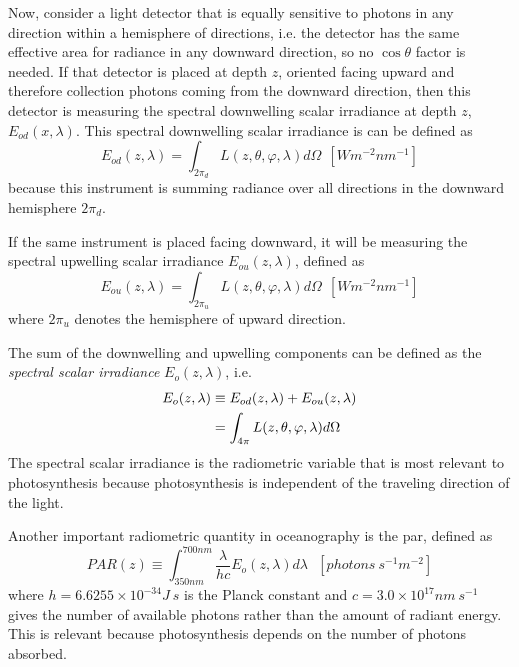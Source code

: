 Now, consider a light detector that is equally sensitive to photons in any direction within a hemisphere of directions, i.e. the detector has the same effective area for radiance in any downward direction, so no $\cos{\theta}$ factor is needed. If that detector is placed at depth $z$, oriented facing upward and therefore collection photons coming from the downward direction, then this detector is measuring the spectral downwelling scalar irradiance at depth $z$, $E_{od}(x,\lambda)$. This spectral downwelling scalar irradiance is can be defined as
\begin{equation}\label{eq:Eod}
  E_{od}(z,\lambda)=\int_{2\pi_d} L(z,\theta,\varphi,\lambda)d\Omega~~\left[Wm^{-2}nm^{-1} \right]
\end{equation}
because this instrument is summing radiance over all directions in the downward hemisphere $2\pi_d$.

If the same instrument is placed facing downward, it will be measuring the spectral upwelling scalar irradiance $ E_{ou}(z,\lambda)$, defined as
\begin{equation}
  E_{ou}(z,\lambda)=\int_{2\pi_u} L(z,\theta,\varphi,\lambda)d\Omega~~\left[Wm^{-2}nm^{-1} \right]
\end{equation}
where $2\pi_u$ denotes the hemisphere of upward direction.

The sum of the downwelling and upwelling components can be defined as the {\it spectral scalar irradiance} $E_o(z,\lambda)$, i.e.
\begin{align}
  E_{o}(z,\lambda) &\equiv E_{od}(z,\lambda)+E_{ou}(z,\lambda)\notag \\
           &=\int_{4\pi} L(z,\theta,\varphi,\lambda)d\Omega
\end{align}
The spectral scalar irradiance is the radiometric variable that is most relevant to photosynthesis because photosynthesis is independent of the traveling direction of the light.

Another important radiometric quantity in oceanography is the \gls{par}, defined as
\begin{equation}
  PAR(z)\equiv \int_{350nm}^{700nm} \frac{\lambda}{hc}E_o(z,\lambda)d\lambda~~~\left[photons~s^{-1}m^{-2} \right]
\end{equation}
where $h=6.6255\times10^{-34}J~s$ is the Planck constant and $c=3.0\times10^{17}nm~s^{-1}$ gives the number of available photons rather than the amount of radiant energy. This is relevant because photosynthesis depends on the number of photons absorbed.

